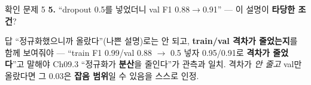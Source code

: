 \begin{frame}{확인 문제 5}
  \small
  \textbf{5.} ``dropout 0.5를 넣었더니 val F1 0.88$\to$0.91'' —
  이 설명이 \textbf{타당한 조건}?
  \begin{block}{답}
    ``정규화했으니까 올랐다''(나쁜 설명)로는 안 되고,
    \textbf{train/val 격차가 줄었는지}를 함께 보여줘야 —
    ``train F1 0.99/val 0.88 $\to$ 0.5 넣자 0.95/0.91로
    \textbf{격차가 줄었다}''고 말해야 Ch09.3 ``정규화가
    \textbf{분산}을 줄인다''가 관측과 일치. 격차가 \textit{안
    줄고} val만 올랐다면 그 0.03은 \textbf{잡음 범위}일 수
    있음을 스스로 인정.
  \end{block}
\end{frame}
